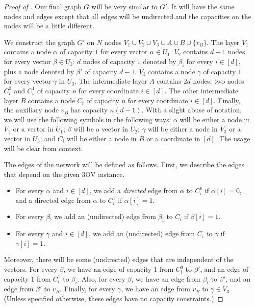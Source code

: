 \documentclass{toc}
\theoremstyle{plain}
\newcommand{\ProblemName}[1]{\textsf{#1}}
\newcommand{\TOV}{\ProblemName{$3$OV}\xspace}
\begin{document}
\begin{proof}[Proof of ]
Our final graph $G$ will be very similar to $G'$. It will have the same nodes and edges except that all edges will be undirected and the capacities on the nodes will be a little different.

We construct the graph $G'$ on $N$ nodes $V_1\cup V_2\cup V_3\cup A\cup B\cup \{v_B\}$.
The layer $V_1$ contains a node $\alpha$ of capacity $1$ for every vector $\alpha\in U_1$.
$V_2$ contains $d+1$ nodes for every vector $\beta\in U_2$: $d$ nodes of capacity $1$ denoted by $\beta_i$ for every $i\in[d]$, plus a node denoted by $\beta'$ of capacity $d-1$.
$V_3$ contains a node $\gamma$ of capacity $1$ for every vector $\gamma$ in $U_3$.
The intermediate layer $A$ contains $2d$ nodes: two nodes $C_i^{0}$ and $C_i^{1}$ of capacity $n$ for every coordinate $i\in [d]$.
The other intermediate layer $B$ contains a node $C_i$ of capacity $n$ for every coordinate $i\in [d]$.
Finally, the auxiliary node $v_B$ has capacity $n(d-1)$.
With a slight abuse of notation, we will use the following symbols in the following ways: $\alpha$ will be either a node in $V_1$ or a vector in $U_1$; $\beta$ will be a vector in $U_2$;  $\gamma$ will be either a node in $V_3$ or a vector in $U_3$; and $C_i$ will be either a node in $B$ or a coordinate in $[d]$. The usage will be clear from context.

The edges of the network will be defined as follows. First, we describe the edges that depend on the given \TOV instance.
\begin{itemize}
\item For every $\alpha$ and $i\in [d]$, we add a \emph{directed} edge from $\alpha$ to $C_i^{0}$ if $\alpha [i]=0$, and a directed edge from $\alpha$ to $C_i^{1}$ if $\alpha [i]=1$.
\item For every $\beta$, we add an (undirected) edge from $\beta_i$ to $C_i$ if $\beta [i]=1$.
\item  For every $\gamma$ and $i\in [d]$, we add an (undirected) edge from $C_i$ to $\gamma$ if $\gamma [i]=1$.
\end{itemize}
Moreover, there will be some (undirected) edges that are independent of the vectors.
For every $\beta$, we have an edge of capacity $1$ from $C_i^{0}$ to ${\beta}'$, and an edge of capacity $1$ from $C_i^{1}$ to $\beta_i$.
Also, for every $\beta$, we have an edge from $\beta_i$ to $\beta'$, and an edge from ${\beta}'$ to $v_B$.
Finally, for every $\gamma$, we have an edge from $v_B$ to $\gamma\in V_3$. (Unless specified otherwise, these edges have no capacity constraints.)


\end{proof}
\end{document}

